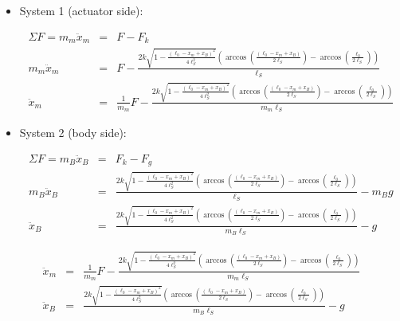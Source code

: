 \documentclass[letterpaper, 12 pt]{article}  %
\begin{document}
	\begin{itemize}
		\item System 1 (actuator side):

		\begin{eqnarray*}
		\Sigma F=m_{m}\ddot{x}_{m} & = & F-F_{k}\\
		m_{m}\ddot{x}_{m} & = & F-\frac{2k\sqrt{1-\frac{\left(\ell_{0}-x_{m}+x_{B}\right)^{2}}{4\ell_{S}^{2}}}\left(\arccos\left(\frac{\left(\ell_{0}-x_{m}+x_{B}\right)}{2\ell_{S}}\right)-\arccos\left(\frac{\ell_{0}}{2\ell_{S}}\right)\right)}{\ell_{S}}\\
		\ddot{x}_{m} & = & \frac{1}{m_{m}}F-\frac{2k\sqrt{1-\frac{\left(\ell_{0}-x_{m}+x_{B}\right)^{2}}{4\ell_{S}^{2}}}\left(\arccos\left(\frac{\left(\ell_{0}-x_{m}+x_{B}\right)}{2\ell_{S}}\right)-\arccos\left(\frac{\ell_{0}}{2\ell_{S}}\right)\right)}{m_{m}\ell_{S}}
		\end{eqnarray*}

		\item System 2 (body side):

		\begin{eqnarray*}
		\Sigma F=m_{B}\ddot{x}_{B} & = & F_{k}-F_{g}\\
		m_{B}\ddot{x}_{B} & = & \frac{2k\sqrt{1-\frac{\left(\ell_{0}-x_{m}+x_{B}\right)^{2}}{4\ell_{S}^{2}}}\left(\arccos\left(\frac{\left(\ell_{0}-x_{m}+x_{B}\right)}{2\ell_{S}}\right)-\arccos\left(\frac{\ell_{0}}{2\ell_{S}}\right)\right)}{\ell_{S}}-m_{B}g\\
		\ddot{x}_{B} & = & \frac{2k\sqrt{1-\frac{\left(\ell_{0}-x_{m}+x_{B}\right)^{2}}{4\ell_{S}^{2}}}\left(\arccos\left(\frac{\left(\ell_{0}-x_{m}+x_{B}\right)}{2\ell_{S}}\right)-\arccos\left(\frac{\ell_{0}}{2\ell_{S}}\right)\right)}{m_{B}\ell_{S}}-g
		\end{eqnarray*}

	\end{itemize}


	\begin{eqnarray*}
	\ddot{x}_{m} & = & \frac{1}{m_{m}}F-\frac{2k\sqrt{1-\frac{\left(\ell_{0}-x_{m}+x_{B}\right)^{2}}{4\ell_{S}^{2}}}\left(\arccos\left(\frac{\left(\ell_{0}-x_{m}+x_{B}\right)}{2\ell_{S}}\right)-\arccos\left(\frac{\ell_{0}}{2\ell_{S}}\right)\right)}{m_{m}\ell_{S}}\\
	\ddot{x}_{B} & = & \frac{2k\sqrt{1-\frac{\left(\ell_{0}-x_{m}+x_{B}\right)^{2}}{4\ell_{S}^{2}}}\left(\arccos\left(\frac{\left(\ell_{0}-x_{m}+x_{B}\right)}{2\ell_{S}}\right)-\arccos\left(\frac{\ell_{0}}{2\ell_{S}}\right)\right)}{m_{B}\ell_{S}}-g
	\end{eqnarray*}
\end{document}
